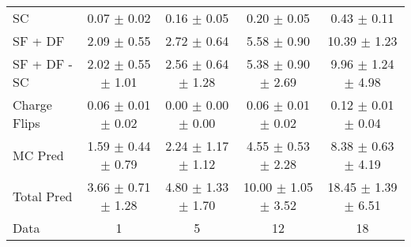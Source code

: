 \begin{tabular}{l|cccc}
                                 SC &  0.07 $\pm$  0.02 &  0.16 $\pm$  0.05 &  0.20 $\pm$  0.05 &  0.43 $\pm$  0.11 \\
                            SF + DF &  2.09 $\pm$  0.55 &  2.72 $\pm$  0.64 &  5.58 $\pm$  0.90 & 10.39 $\pm$  1.23 \\
\hline
                       SF + DF - SC &  2.02 $\pm$  0.55 $\pm$  1.01 &  2.56 $\pm$  0.64 $\pm$  1.28 &  5.38 $\pm$  0.90 $\pm$  2.69 &  9.96 $\pm$  1.24 $\pm$  4.98 \\
\hline\hline
                       Charge Flips &  0.06 $\pm$  0.01 $\pm$  0.02 &  0.00 $\pm$  0.00 $\pm$  0.00 &  0.06 $\pm$  0.01 $\pm$  0.02 &  0.12 $\pm$  0.01 $\pm$  0.04 \\
\hline
                            MC Pred &  1.59 $\pm$  0.44 $\pm$  0.79 &  2.24 $\pm$  1.17 $\pm$  1.12 &  4.55 $\pm$  0.53 $\pm$  2.28 &  8.38 $\pm$  0.63 $\pm$  4.19 \\
\hline
                         Total Pred &  3.66 $\pm$  0.71 $\pm$  1.28 &  4.80 $\pm$  1.33 $\pm$  1.70 & 10.00 $\pm$  1.05 $\pm$  3.52 & 18.45 $\pm$  1.39 $\pm$  6.51 \\
\hline\hline
                               Data &     1 &     5 &    12 &    18 \\
\hline\hline
\end{tabular}

